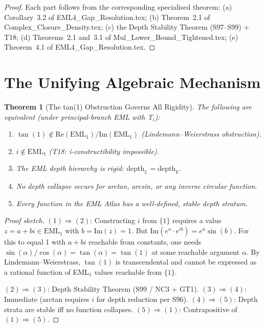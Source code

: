 \documentclass[11pt]{article}
\newtheorem{theorem}{Theorem}
\begin{document}
\begin{proof}
Each part follows from the corresponding specialised theorem:
(a) Corollary~3.2 of EML4\_Gap\_Resolution.tex;
(b) Theorem~2.1 of Complex\_Closure\_Density.tex;
(c) the Depth Stability Theorem (S97--S99) + T18;
(d) Theorems~2.1 and~3.1 of Mul\_Lower\_Bound\_Tightened.tex;
(e) Theorem~4.1 of EML4\_Gap\_Resolution.tex.
\end{proof}

\section{The Unifying Algebraic Mechanism}

\begin{theorem}[The tan(1) Obstruction Governs All Rigidity]\label{thm:tan1}
The following are equivalent (under principal-branch EML with T$_i$):
\begin{enumerate}
\item $\tan(1) \notin \mathrm{Re}(\mathrm{EML}_1) / \mathrm{Im}(\mathrm{EML}_1)$
      (\emph{Lindemann--Weierstrass obstruction}).
\item $i \notin \mathrm{EML}_1$ (T18: i-constructibility impossible).
\item The EML depth hierarchy is rigid: $\mathrm{depth}_\mathbb{C} = \mathrm{depth}_\mathbb{R}$.
\item No depth collapse occurs for arctan, arcsin, or any inverse circular function.
\item Every function in the EML Atlas has a well-defined, stable depth stratum.
\end{enumerate}
\end{theorem}

\begin{proof}[Proof sketch]
$(1) \Rightarrow (2)$: Constructing $i$ from $\{1\}$ requires a value
$z = a + bi \in \mathrm{EML}_1$ with $b = \mathrm{Im}(z) = 1$.  But
$\mathrm{Im}(e^a \cdot e^{ib}) = e^a \sin(b)$. For this to equal 1 with
$a + bi$ reachable from constants, one needs $\sin(\alpha) / \cos(\alpha) = \tan(\alpha) = \tan(1)$
at some reachable argument $\alpha$. By Lindemann--Weierstrass, $\tan(1)$
is transcendental and cannot be expressed as a rational function of EML$_1$
values reachable from $\{1\}$.

$(2) \Rightarrow (3)$: Depth Stability Theorem (S99 / NC3 + GT1).
$(3) \Rightarrow (4)$: Immediate (arctan requires $i$ for depth reduction per S96).
$(4) \Rightarrow (5)$: Depth strata are stable iff no function collapses.
$(5) \Rightarrow (1)$: Contrapositive of $(1) \Rightarrow (5)$.
\end{proof}
\end{document}
